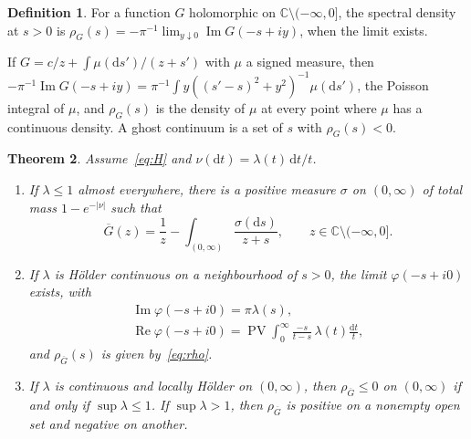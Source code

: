 \documentclass[aps,prd,twocolumn,superscriptaddress,nofootinbib,longbibliography,floatfix,amsmath,amssymb,10pt]{revtex4-2}
\newtheorem{theorem}{Theorem}
\theoremstyle{definition}
\newtheorem{definition}[theorem]{Definition}
\theoremstyle{remark}
\newcommand{\C}{\mathbb{C}}
\newcommand{\Gbar}{\overline{G}}
\newcommand{\dd}{\mathrm{d}}
\newcommand{\cut}{\C\setminus(-\infty,0]}
\DeclareMathOperator{\re}{Re}
\DeclareMathOperator{\im}{Im}
\DeclareMathOperator{\PV}{PV}
\begin{document}
\begin{definition}\label{def:density}
For a function $G$ holomorphic on $\cut$, the spectral density at $s>0$ is
$\rho_G(s)=-\pi^{-1}\lim_{y\downarrow0}\im G(-s+iy)$, when the limit exists.
\end{definition}

If $G=c/z+\int\mu(\dd s')/(z+s')$ with $\mu$ a signed measure, then
$-\pi^{-1}\im G(-s+iy)=\pi^{-1}\int y((s'-s)^2+y^2)^{-1}\mu(\dd s')$, the
Poisson integral of $\mu$, and $\rho_G(s)$ is the density of $\mu$ at every
point where $\mu$ has a continuous density. A ghost continuum is a set of $s$
with $\rho_G(s)<0$.

\begin{theorem}\label{thm:threshold}
Assume~\eqref{eq:H} and $\nu(\dd t)=\lambda(t)\,\dd t/t$.
\begin{enumerate}[label=(\roman*),leftmargin=*,itemsep=1pt]
\item If $\lambda\le1$ almost everywhere, there is a positive measure $\sigma$
on $(0,\infty)$ of total mass $1-e^{-|\nu|}$ such that
\begin{equation}\label{eq:pureghost}
\Gbar(z)=\frac1z-\int_{(0,\infty)}\frac{\sigma(\dd s)}{z+s},\qquad z\in\cut .
\end{equation}
\item If $\lambda$ is H\"older continuous on a neighbourhood of $s>0$, the
limit $\varphi(-s+i0)$ exists, with
\begin{gather*}
\im\varphi(-s+i0)=\pi\lambda(s),\\
\re\varphi(-s+i0)=\PV\!\int_0^\infty\frac{-s}{t-s}\,\lambda(t)\frac{\dd t}{t},
\end{gather*}
and $\rho_{\Gbar}(s)$ is given by~\eqref{eq:rho}.
\item If $\lambda$ is continuous and locally H\"older on $(0,\infty)$, then
$\rho_{\Gbar}\le0$ on $(0,\infty)$ if and only if $\sup\lambda\le1$. If
$\sup\lambda>1$, then $\rho_{\Gbar}$ is positive on a nonempty open set and
negative on another.
\end{enumerate}
\end{theorem}
\end{document}
